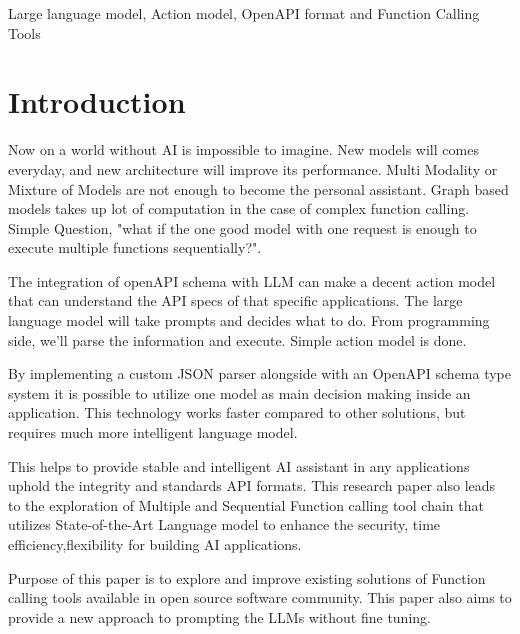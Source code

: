 \documentclass[conference]{IEEEtran}
\begin{document}
\begin{IEEEkeywords}
Large language model, Action model, OpenAPI format and Function Calling Tools
\end{IEEEkeywords}

\section{Introduction}
Now on a world without AI is impossible to imagine. New models will comes everyday, and new architecture will improve its performance. Multi Modality or Mixture of Models are not enough to become the personal assistant. Graph based models takes up lot of computation in the case of complex function calling. Simple Question, "what if the one good model with one request is enough to execute multiple functions sequentially?".

The integration of openAPI schema with LLM can make a decent action model that can understand the API specs of that specific applications. The large language model will take prompts and decides what to do. From programming side, we'll parse the information and execute. Simple action model is done. 

By implementing a custom JSON parser alongside with an OpenAPI schema type system it is possible to utilize one model as main decision making inside an application. This technology works faster compared to other solutions, but requires much more intelligent language model.

This helps to provide stable and intelligent AI assistant in any applications uphold the integrity and standards API formats. This research paper also leads to the exploration of Multiple and Sequential Function calling tool chain that utilizes State-of-the-Art Language model to enhance the security, time efficiency,flexibility for building AI applications. 

Purpose of this paper is to explore and improve existing solutions of Function calling tools available in open source software community. This paper also aims to provide a new approach to prompting the LLMs without fine tuning.
\end{document}
